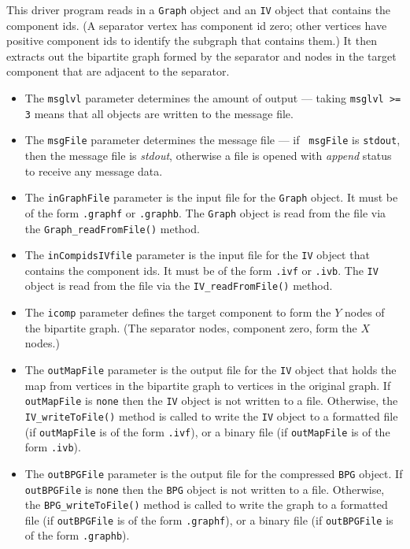 \begin{enumerate}
\begin{verbatim}
\end{verbatim}
This driver program reads in a {\tt Graph} object 
and an {\tt IV} object that contains the component ids.
(A separator vertex has component id zero; other vertices have
positive component ids to identify the subgraph that contains
them.)
It then extracts out the bipartite graph formed by the separator
and nodes in the target component that are adjacent to the separator.
\begin{itemize}
\item
The {\tt msglvl} parameter determines the amount of output ---
taking {\tt msglvl >= 3} means that all objects are written
to the message file.
\item
The {\tt msgFile} parameter determines the message file --- if {\tt
msgFile} is {\tt stdout}, then the message file is {\it stdout},
otherwise a file is opened with {\it append} status to receive any
message data.
\item
The {\tt inGraphFile} parameter is the input file for the {\tt Graph}
object. It must be of the form {\tt *.graphf} or {\tt *.graphb}.
The {\tt Graph} object is read from the file via the
{\tt Graph\_readFromFile()} method.
\item
The {\tt inCompidsIVfile} parameter is the input file for the {\tt IV}
object that contains the component ids. 
It must be of the form {\tt *.ivf} or {\tt *.ivb}.
The {\tt IV} object is read from the file via the
{\tt IV\_readFromFile()} method.
\item
The {\tt icomp} parameter defines the target component to form the
$Y$ nodes of the bipartite graph. 
(The separator nodes, component zero, form the $X$ nodes.)
\item
The {\tt outMapFile} parameter is the output file for the {\tt IV}
object that holds the map from vertices in the bipartite graph to
vertices in the original graph.
If {\tt outMapFile} is {\tt none} then the {\tt IV} object is not
written to a file. 
Otherwise, the {\tt IV\_writeToFile()} method is called to write
the {\tt IV} object to 
a formatted file (if {\tt outMapFile} is of the form {\tt *.ivf}),
or
a binary file (if {\tt outMapFile} is of the form {\tt *.ivb}).
\item
The {\tt outBPGFile} parameter is the output file for the 
compressed {\tt BPG} object. 
If {\tt outBPGFile} is {\tt none} then the {\tt BPG} object is not
written to a file. 
Otherwise, the {\tt BPG\_writeToFile()} method is called to write
the graph to 
a formatted file (if {\tt outBPGFile} is of the form {\tt *.graphf}),
or
a binary file (if {\tt outBPGFile} is of the form {\tt *.graphb}).

\end{itemize}
\end{enumerate}
